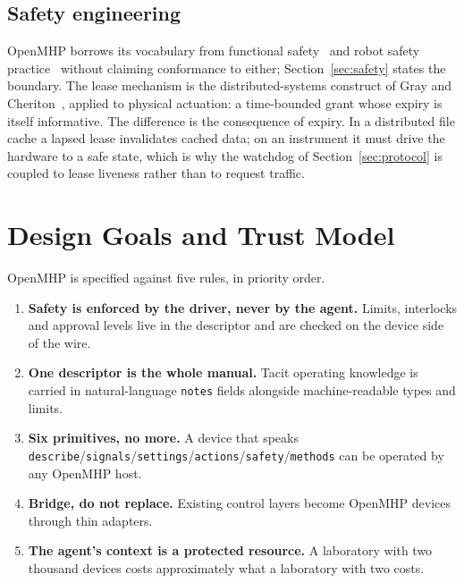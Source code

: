 \documentclass[11pt]{article}
\begin{document}
\subsection{Safety engineering}
OpenMHP borrows its vocabulary from functional safety~\cite{iec61508} and robot safety
practice~\cite{iso10218,iso15066} without claiming conformance to either; Section~\ref{sec:safety}
states the boundary. The lease mechanism is the distributed-systems construct of
Gray and Cheriton~\cite{gray1989}, applied to physical actuation: a time-bounded grant whose
expiry is itself informative. The difference is the consequence of expiry. In a distributed
file cache a lapsed lease invalidates cached data; on an instrument it must drive the
hardware to a safe state, which is why the watchdog of Section~\ref{sec:protocol} is coupled
to lease liveness rather than to request traffic.

\section{Design Goals and Trust Model}
\label{sec:goals}

OpenMHP is specified against five rules, in priority order.

\begin{enumerate}
  \item \textbf{Safety is enforced by the driver, never by the agent.} Limits, interlocks and
    approval levels live in the descriptor and are checked on the device side of the wire.
  \item \textbf{One descriptor is the whole manual.} Tacit operating knowledge is carried in
    natural-language \texttt{notes} fields alongside machine-readable types and limits.
  \item \textbf{Six primitives, no more.} A device that speaks
    \texttt{describe}/\texttt{signals}/\texttt{settings}/\texttt{actions}/\texttt{safety}/\texttt{methods}
    can be operated by any OpenMHP host.
  \item \textbf{Bridge, do not replace.} Existing control layers become OpenMHP devices
    through thin adapters.
  \item \textbf{The agent's context is a protected resource.} A laboratory with two thousand
    devices costs approximately what a laboratory with two costs.
\end{enumerate}
\end{document}
